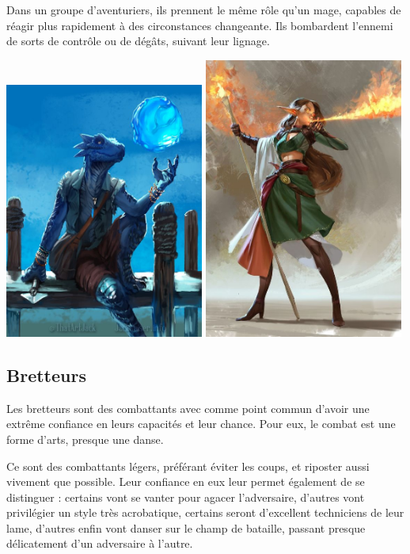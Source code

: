 \documentclass[10pt,a4paper]{book}
\begin{document}
Dans un groupe d'aventuriers, ils prennent le même rôle qu'un mage, capables de réagir plus rapidement à des circonstances changeante. Ils bombardent l'ennemi de sorts de contrôle ou de dégâts, suivant leur lignage.

\includegraphics[width=0.49\textwidth]{ensorceleur 1}
\includegraphics[width=0.49\textwidth]{ensorceleur 2}
\subsection{Bretteurs}
Les bretteurs sont des combattants avec comme point commun d'avoir une extrême confiance en leurs capacités et leur chance. Pour eux, le combat est une forme d'arts, presque une danse.

Ce sont des combattants légers, préférant éviter les coups, et riposter aussi vivement que possible. Leur confiance en eux leur permet également de  se distinguer : certains vont se vanter pour agacer l'adversaire, d'autres vont privilégier un style très acrobatique, certains seront d'excellent techniciens de leur lame, d'autres enfin vont danser sur le champ de bataille, passant presque délicatement d'un adversaire à l'autre.
\end{document}
